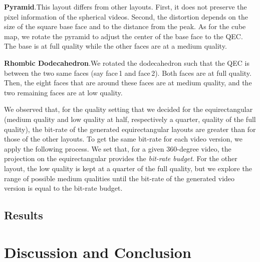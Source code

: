 \documentclass{sig-alternate}
\newcommand{\parag}[1]{\vspace{5pt}\noindent\textbf{#1}.\hspace{5pt}}
\begin{document}
\parag{Pyramid}This layout differs from other layouts. First, it does not preserve
the pixel information of the spherical videos. Second, the distortion depends on the size of the square
base face and to the distance from the peak. As for the cube map, we rotate the pyramid to adjust
the center of the base face to the \ac{QEC}. The base is at full quality while the other faces are
at a medium quality. 

\parag{Rhombic Dodecahedron}We rotated the dodecahedron such that the \ac{QEC} is between
the two same faces (say face\,1 and face\,2). Both faces are at full quality. Then, the eight 
faces that are around
these faces are at medium quality, and the two remaining faces are at low quality.

We observed that, for the quality setting that we decided for the equirectangular (medium quality and 
low quality at half, respectively a quarter, quality of the full quality), the bit-rate of the
generated equirectangular layouts are greater than for those of the other layouts. To get the
same bit-rate for each video version, we apply the following process. We set that, for a given 
360-degree video, the projection on the equirectangular provides the \emph{bit-rate budget}. For the
other layout, the low quality is kept at a quarter of the full quality, but we explore the range of
possible medium qualities until the bit-rate of the generated video version is equal to the 
bit-rate budget.

\subsection{Results}

\section{Discussion and Conclusion}

\newpage
%
%
  
%  

\end{document}
